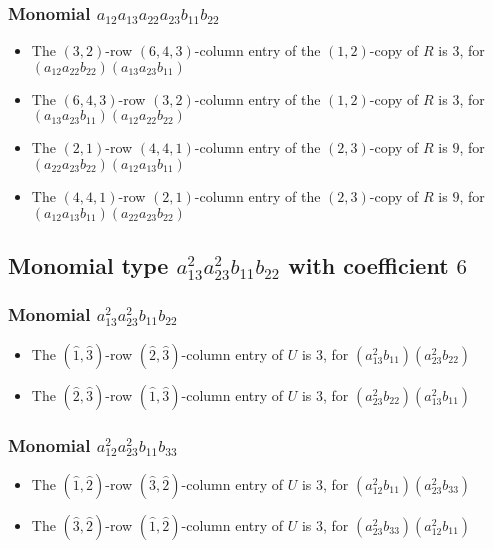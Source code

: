 \documentclass{article}
\begin{document}
\subsubsection{Monomial $ a_{12} a_{13} a_{22} a_{23} b_{11} b_{22} $}

\begin{itemize}
\item The $(3, 2)$-row $(6, 4, 3)$-column entry of the $ \left(1, 2\right) $-copy of $R$ is $ 3 $, for $( a_{12} a_{22} b_{22} )( a_{13} a_{23} b_{11} )$ 
\item The $(6, 4, 3)$-row $(3, 2)$-column entry of the $ \left(1, 2\right) $-copy of $R$ is $ 3 $, for $( a_{13} a_{23} b_{11} )( a_{12} a_{22} b_{22} )$ 
\item The $(2, 1)$-row $(4, 4, 1)$-column entry of the $ \left(2, 3\right) $-copy of $R$ is $ 9 $, for $( a_{22} a_{23} b_{22} )( a_{12} a_{13} b_{11} )$ 
\item The $(4, 4, 1)$-row $(2, 1)$-column entry of the $ \left(2, 3\right) $-copy of $R$ is $ 9 $, for $( a_{12} a_{13} b_{11} )( a_{22} a_{23} b_{22} )$ 
\end{itemize}
\subsection{Monomial type $ a_{13}^{2} a_{23}^{2} b_{11} b_{22} $ with coefficient $ 6 $}

\subsubsection{Monomial $ a_{13}^{2} a_{23}^{2} b_{11} b_{22} $}

\begin{itemize}
\item The $(\hat{1}, \hat{3})$-row $(\hat{2}, \hat{3})$-column entry of $U$ is $3$, for $( a_{13}^{2} b_{11} )( a_{23}^{2} b_{22} )$ 
\item The $(\hat{2}, \hat{3})$-row $(\hat{1}, \hat{3})$-column entry of $U$ is $3$, for $( a_{23}^{2} b_{22} )( a_{13}^{2} b_{11} )$ 
\end{itemize}
\subsubsection{Monomial $ a_{12}^{2} a_{23}^{2} b_{11} b_{33} $}

\begin{itemize}
\item The $(\hat{1}, \hat{2})$-row $(\hat{3}, \hat{2})$-column entry of $U$ is $3$, for $( a_{12}^{2} b_{11} )( a_{23}^{2} b_{33} )$ 
\item The $(\hat{3}, \hat{2})$-row $(\hat{1}, \hat{2})$-column entry of $U$ is $3$, for $( a_{23}^{2} b_{33} )( a_{12}^{2} b_{11} )$ 
\end{itemize}
\end{document}
